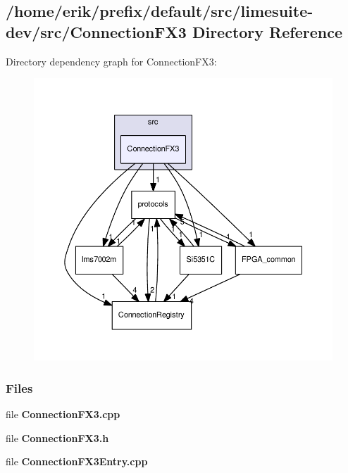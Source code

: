 \subsection{/home/erik/prefix/default/src/limesuite-\/dev/src/\+Connection\+F\+X3 Directory Reference}
\label{dir_5818caaaedc732a4ca3b2f4f19145392}
Directory dependency graph for Connection\+F\+X3\+:
\nopagebreak
\begin{figure}[H]
\begin{center}
\leavevmode
\includegraphics[width=350pt]{dir_5818caaaedc732a4ca3b2f4f19145392_dep}
\end{center}
\end{figure}
\subsubsection*{Files}
\begin{DoxyCompactItemize}
\item 
file {\bf Connection\+F\+X3.\+cpp}
\item 
file {\bf Connection\+F\+X3.\+h}
\item 
file {\bf Connection\+F\+X3\+Entry.\+cpp}
\end{DoxyCompactItemize}
